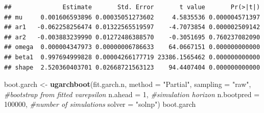 \documentclass[
]{book}
\newenvironment{Shaded}{\begin{snugshade}}{\end{snugshade}}
\newcommand{\AttributeTok}[1]{\textcolor[rgb]{0.13,0.29,0.53}{#1}}
\newcommand{\CommentTok}[1]{\textcolor[rgb]{0.56,0.35,0.01}{\textit{#1}}}
\newcommand{\DecValTok}[1]{\textcolor[rgb]{0.00,0.00,0.81}{#1}}
\newcommand{\FunctionTok}[1]{\textcolor[rgb]{0.13,0.29,0.53}{\textbf{#1}}}
\newcommand{\NormalTok}[1]{#1}
\newcommand{\OtherTok}[1]{\textcolor[rgb]{0.56,0.35,0.01}{#1}}
\newcommand{\SpecialCharTok}[1]{\textcolor[rgb]{0.81,0.36,0.00}{\textbf{#1}}}
\newcommand{\StringTok}[1]{\textcolor[rgb]{0.31,0.60,0.02}{#1}}
\begin{document}
\begin{Shaded}
\end{Shaded}

\begin{verbatim}
##              Estimate       Std. Error       t value       Pr(>|t|)
## mu     0.001606593896 0.00035051273602     4.5835536 0.000004571397
## ar1   -0.062258256474 0.01322565519597    -4.7073854 0.000002509142
## ar2   -0.003883239990 0.01272486388570    -0.3051695 0.760237082090
## omega  0.000004347973 0.00000006786633    64.0667151 0.000000000000
## beta1  0.997694999828 0.00004266177719 23386.1565462 0.000000000000
## shape  2.520360403701 0.02668721563123    94.4407404 0.000000000000
\end{verbatim}

\begin{Shaded}
\begin{Highlighting}[]
\NormalTok{boot.garch }\OtherTok{\textless{}{-}} \FunctionTok{ugarchboot}\NormalTok{(fit.garch.n,}
                         \AttributeTok{method =} \StringTok{"Partial"}\NormalTok{,}
                         \AttributeTok{sampling =} \StringTok{"raw"}\NormalTok{,  }\CommentTok{\#bootstrap from fitted varepsilon}
                         \AttributeTok{n.ahead =} \DecValTok{1}\NormalTok{,          }\CommentTok{\#simulation horizon}
                         \AttributeTok{n.bootpred =} \DecValTok{100000}\NormalTok{, }\CommentTok{\#number of simulations }
                         \AttributeTok{solver =} \StringTok{"solnp"}\NormalTok{)}
\NormalTok{boot.garch}
\end{Highlighting}
\end{Shaded}
\end{document}
